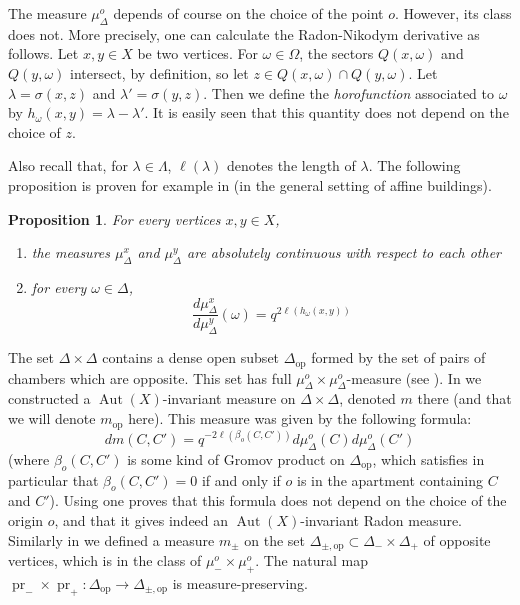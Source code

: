 \documentclass[a4paper, 11pt]{article}
\theoremstyle{plain}
\newtheorem{proposition}{Proposition}[section]
\theoremstyle{definition}
\theoremstyle{remark}
\DeclareMathOperator{\Aut}{Aut}
\DeclareMathOperator{\pr}{pr}
\newcommand{\op}{\mathrm{op}}
\newcommand{\pmop}{ {\pm,\mathrm{op}}}
\begin{document}
The measure $\mu_\Delta^o $ depends of course on the choice of the point $o$. However, its class does not. More precisely, one can calculate the Radon-Nikodym derivative as follows. Let $x,y\in X$ be two vertices. For $\omega\in\Omega$, the sectors $Q(x,\omega)$ and $Q(y,\omega)$ intersect, by definition, so let $z\in Q(x,\omega)\cap Q(y,\omega)$. Let $\lambda=\sigma(x,z)$ and $\lambda'=\sigma(y,z)$. Then we define the \emph{horofunction} associated to $\omega$ by $h_\omega(x,y)= \lambda-\lambda'$. It is easily seen that this quantity does not depend on the choice of $z$.

Also recall that, for $\lambda\in\Lambda$, $\ell(\lambda)$ denotes the length of $\lambda$.  The following proposition is proven for example in \cite[Theorem 3.17]{Parkinson} (in the general setting of affine buildings).


\begin{proposition}\label{prop:changebasepoint}
For every vertices $x,y\in X$,
\begin{enumerate}
\item the measures $\mu_\Delta^x$ and $\mu_\Delta^y$ are absolutely continuous with respect to  each other
\item 
for every $\omega\in \Delta$, $$\frac{d\mu_\Delta^x}{d\mu_\Delta^y}(\omega)  = q^{2\ell(h_\omega(x,y))}$$
\end{enumerate}
\end{proposition}



The set $\Delta\times \Delta$ contains a dense open subset $\Delta_\op$ formed by the set of pairs of chambers which are opposite. This set has full $\mu^o_\Delta \times \mu^o_\Delta$-measure (see \cite[Proposition 6.8]{BCL}). In \cite[\S6.2]{BCL} we constructed a $\Aut(X)$-invariant measure on $\Delta\times \Delta$, denoted $m$ there (and that we will denote $m_\op$ here). This measure was given by the following formula:
$$dm(C,C')= q^{-2\ell(\beta_o(C,C'))}d\mu_\Delta^o(C) d\mu_\Delta^o(C')$$
(where $\beta_o(C,C')$ is some kind of Gromov product on $\Delta_\op$, which satisfies in particular that $\beta_o(C,C')=0$  if and only if $o$ is in the apartment containing $C$ and $C'$).
Using \cite[Lemma 6.9]{BCL} one proves that this formula does not depend on the choice of the origin $o$, and that it gives indeed an $\Aut(X)$-invariant Radon measure. Similarly in \cite[Definition 6.14]{BCL} we defined a measure $m_\pm$ on the set $\Delta_\pmop\subset \Delta_-\times\Delta_+$ of opposite vertices, which is in the class of $\mu_-^o \times \mu_+^ o$. The natural map $\pr_-\times \pr_+:\Delta_\op\to \Delta_\pmop$ is measure-preserving.
\index{$m_\op,m_\pm$\hfill invariant measures on $\Delta_\op$ and $\Delta_\pmop$|bb}
\end{document}
